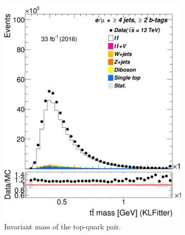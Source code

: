 



\begin{figure} %
	\centering
	
	
	
	
	\medskip	
	\begin{subfigure}{0.25\textwidth}
		\includegraphics[width=\linewidth]{ControlPlots_emujets_2016_4incl_2incl/klf_ttbar_m_emujets_2016.png}
		\caption{Invariant mass of the  top-quark pair.} \label{fig:K21}
	\end{subfigure}	
\hspace*{0.5cm}
	\begin{subfigure}{0.25\textwidth}

\end{subfigure}
\end{figure}

